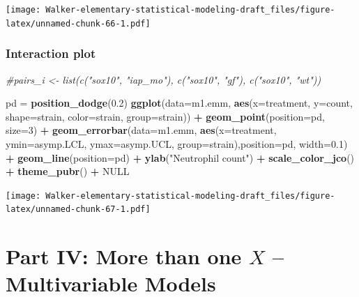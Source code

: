 \documentclass[]{book}
\newenvironment{Shaded}{\begin{snugshade}}{\end{snugshade}}
\newcommand{\KeywordTok}[1]{\textcolor[rgb]{0.13,0.29,0.53}{\textbf{#1}}}
\newcommand{\DataTypeTok}[1]{\textcolor[rgb]{0.13,0.29,0.53}{#1}}
\newcommand{\DecValTok}[1]{\textcolor[rgb]{0.00,0.00,0.81}{#1}}
\newcommand{\FloatTok}[1]{\textcolor[rgb]{0.00,0.00,0.81}{#1}}
\newcommand{\StringTok}[1]{\textcolor[rgb]{0.31,0.60,0.02}{#1}}
\newcommand{\CommentTok}[1]{\textcolor[rgb]{0.56,0.35,0.01}{\textit{#1}}}
\newcommand{\OtherTok}[1]{\textcolor[rgb]{0.56,0.35,0.01}{#1}}
\newcommand{\OperatorTok}[1]{\textcolor[rgb]{0.81,0.36,0.00}{\textbf{#1}}}
\newcommand{\NormalTok}[1]{#1}
\begin{document}
\texttt{[image: Walker-elementary-statistical-modeling-draft\_files/figure-latex/unnamed-chunk-66-1.pdf]}

\subsection{Interaction plot}\label{interaction-plot}

\begin{Shaded}
\begin{Highlighting}[]
\CommentTok{#pairs_i <- list(c("sox10", "iap_mo"), c("sox10", "gf"), c("sox10", "wt"))}

\NormalTok{pd =}\StringTok{ }\KeywordTok{position_dodge}\NormalTok{(}\FloatTok{0.2}\NormalTok{)}
\KeywordTok{ggplot}\NormalTok{(}\DataTypeTok{data=}\NormalTok{m1.emm, }\KeywordTok{aes}\NormalTok{(}\DataTypeTok{x=}\NormalTok{treatment, }\DataTypeTok{y=}\NormalTok{count, }\DataTypeTok{shape=}\NormalTok{strain, }\DataTypeTok{color=}\NormalTok{strain, }\DataTypeTok{group=}\NormalTok{strain)) }\OperatorTok{+}
\StringTok{  }\KeywordTok{geom_point}\NormalTok{(}\DataTypeTok{position=}\NormalTok{pd, }\DataTypeTok{size=}\DecValTok{3}\NormalTok{) }\OperatorTok{+}
\StringTok{  }\KeywordTok{geom_errorbar}\NormalTok{(}\DataTypeTok{data=}\NormalTok{m1.emm, }\KeywordTok{aes}\NormalTok{(}\DataTypeTok{x=}\NormalTok{treatment, }\DataTypeTok{ymin=}\NormalTok{asymp.LCL, }\DataTypeTok{ymax=}\NormalTok{asymp.UCL, }\DataTypeTok{group=}\NormalTok{strain),}\DataTypeTok{position=}\NormalTok{pd, }\DataTypeTok{width=}\FloatTok{0.1}\NormalTok{) }\OperatorTok{+}
\StringTok{  }\KeywordTok{geom_line}\NormalTok{(}\DataTypeTok{position=}\NormalTok{pd) }\OperatorTok{+}
\StringTok{  }\KeywordTok{ylab}\NormalTok{(}\StringTok{"Neutrophil count"}\NormalTok{) }\OperatorTok{+}
\StringTok{  }\KeywordTok{scale_color_jco}\NormalTok{() }\OperatorTok{+}
\StringTok{  }\KeywordTok{theme_pubr}\NormalTok{() }\OperatorTok{+}
\StringTok{  }\OtherTok{NULL}
\end{Highlighting}
\end{Shaded}

\texttt{[image: Walker-elementary-statistical-modeling-draft\_files/figure-latex/unnamed-chunk-67-1.pdf]}

\chapter*{\texorpdfstring{Part IV: More than one \(X\) -- Multivariable
Models}{Part IV: More than one X -- Multivariable Models}}\label{part-iv-more-than-one-x-multivariable-models}
\end{document}
